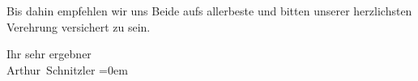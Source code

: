 \pstart
           Bis dahin empfehlen wir uns Beide aufs allerbeste und bitten unserer herzlichsten Verehrung versichert
               zu sein.\pend
           
\pstart
           Ihr sehr ergebner{\\[\baselineskip]}\spacefill\mbox{Arthur Schnitzler}\pend
           \leftskip=0em{}\endnumbering{}  \newcommand{\dateiname}{L02162}\newcommand{\titel}{Arthur Schnitzler an Bertha von Suttner, 10. 12. 1913}\newcommand{\editorInnen}{Martin Anton Müller und Gerd-Hermann Susen}
